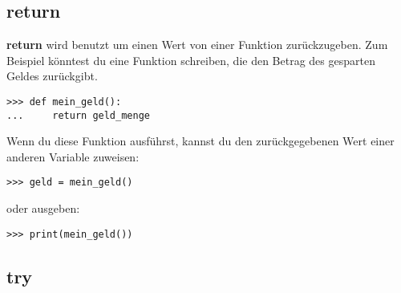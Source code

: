 \subsection*{return}

\textbf{return} wird benutzt um einen Wert von einer Funktion zurückzugeben. Zum Beispiel könntest du eine Funktion schreiben, die den Betrag des gesparten Geldes zurückgibt.

\begin{Verbatim}[frame=single]
>>> def mein_geld():
...     return geld_menge
\end{Verbatim}

\noindent
Wenn du diese Funktion ausführst, kannst du den zurückgegebenen Wert einer anderen Variable zuweisen:

\begin{Verbatim}[frame=single]
>>> geld = mein_geld()
\end{Verbatim}

\noindent
oder ausgeben:

\begin{Verbatim}[frame=single]
>>> print(mein_geld())
\end{Verbatim}

\subsection*{try}

